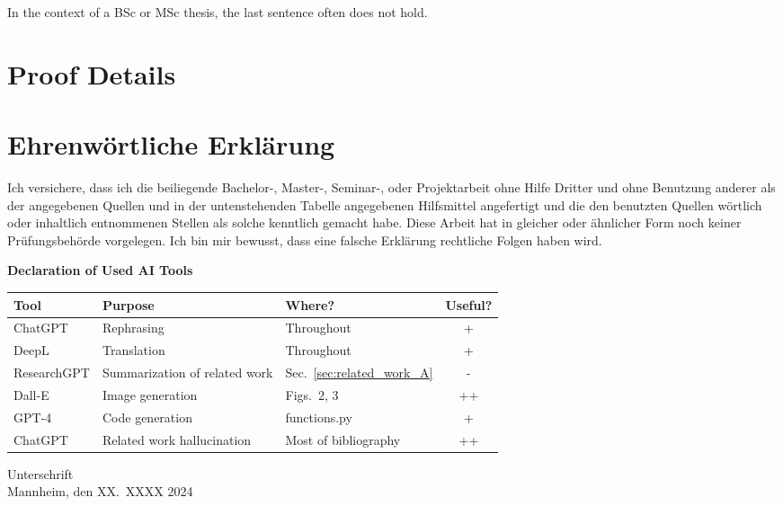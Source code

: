 \documentclass[a4paper,oneside,bibliography=totoc]{scrbook}
\begin{document}
In the context of a BSc or MSc thesis, the last sentence often does not hold.

\chapter{Proof Details}

\backmatter
\chapter{Ehrenwörtliche Erklärung}

Ich versichere, dass ich die beiliegende Bachelor-, Master-, Seminar-, oder
Projektarbeit ohne Hilfe Dritter und ohne Benutzung anderer als der angegebenen
Quellen und in der untenstehenden Tabelle angegebenen Hilfsmittel angefertigt
und die den benutzten Quellen wörtlich oder inhaltlich entnommenen Stellen als
solche kenntlich gemacht habe. Diese Arbeit hat in gleicher oder ähnlicher Form
noch keiner Prüfungsbehörde vorgelegen. Ich bin mir bewusst, dass eine falsche
Erklärung rechtliche Folgen haben wird.

\begin{center}
  \textbf{Declaration of Used AI Tools} \\[.3em]
  \begin{tabularx}{\textwidth}{lXlc}
    \toprule
    Tool & Purpose & Where? & Useful? \\
    \midrule
    ChatGPT & Rephrasing & Throughout & + \\
    DeepL & Translation & Throughout & + \\
    ResearchGPT & Summarization of related work & Sec.~\ref{sec:related_work_A} & - \\
    Dall-E & Image generation & Figs.~2, 3 & ++ \\
    GPT-4 & Code generation & functions.py & + \\
    ChatGPT & Related work hallucination & Most of bibliography & ++ \\
    \bottomrule
  \end{tabularx}
\end{center}

\vspace{2cm}
\noindent Unterschrift\\
\noindent Mannheim, den XX.~XXXX 2024 \hfill
\end{document}

